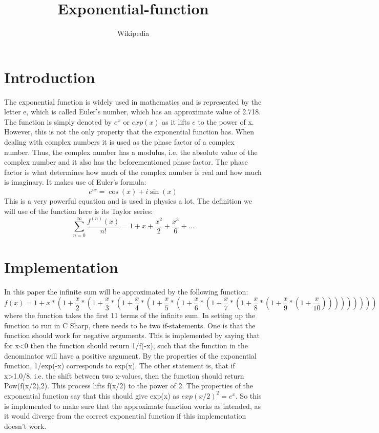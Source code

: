 \documentclass[twocolumn,a4paper]{article}
\begin{document}
\title{Exponential-function}
\author{Wikipedia}
\maketitle


\section{Introduction}

The exponential function is widely used in mathematics and is 
represented by the letter e, which is called Euler's number, which has an 
approximate value of 2.718. The function is simply denoted 
by $e^x$ or $exp(x)$ as it lifts $e$ to the power of x. 
However, this is not the only property that the exponential function has.
When dealing with complex numbers it is used as the phase factor of a complex number.
Thus, the complex number has a modulus, i.e. the absolute value of the complex number
and it also has the beforementioned phase factor. The phase factor is what determines how much of the complex number is real and how much is imaginary.
It makes use of Euler's formula: 
\begin{equation}\label{eq:Euler}
e^{ix} = \cos(x) + i \sin(x)
\end{equation}
This is a very powerful equation and is used in physics a lot.
The definition we will use of the function here is its Taylor series:
\begin{equation}
\sum_{n=0}^{\infty} \frac{f^{(n)} (x)}{n!} = 1 + x + \frac{x^2}{2} + \frac{x^3}{6} + ...
\end{equation}

\section{Implementation}
In this paper the infinite sum will be approximated by the following function:
\begin{equation}\label{eq:approximation}
f(x) = 1+x*(1+\frac{x}{2}*(1+\frac{x}{3}*(1+\frac{x}{4}*(1+\frac{x}{5}*(1+\frac{x}{6}*(1+\frac{x}{7}*(1+\frac{x}{8}*(1+\frac{x}{9}*(1+\frac{x}{10})))))))))
\end{equation}
where the function takes the first 11 terms of the infinite sum.
In setting up the function to run in C Sharp, there needs to be two if-statements.
One is that the function should work for negative arguments. This is implemented
by saying that for x<0 then the function should return 1/f(-x), such that the
function in the denominator will have a positive argument. By the properties of
the exponential function, 1/exp(-x) corresponds to exp(x).
The other statement is, that if x>1.0/8, i.e. the shift between two x-values,
then the function should return Pow(f(x/2),2). This process lifts f(x/2) to the 
power of 2. The properties of the exponential function say that this should give
exp(x) as $exp(x/2)^2=e^x$. So this is implemented to make sure that the
approximate function works as intended, as it would diverge from the correct 
exponential function if this implementation doesn't work.
\end{document}
